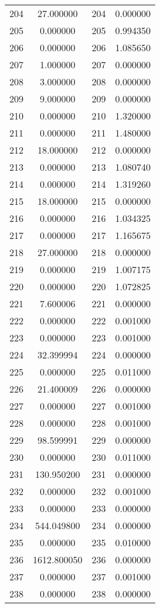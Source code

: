 \documentclass[12pt]{article}
\begin{document}
\begin{longtable}{@{}cccc@{}}
204 & 27.000000 & 204 & 0.000000 \\
205 & 0.000000 & 205 & 0.994350 \\
206 & 0.000000 & 206 & 1.085650 \\
207 & 1.000000 & 207 & 0.000000 \\
208 & 3.000000 & 208 & 0.000000 \\
209 & 9.000000 & 209 & 0.000000 \\
210 & 0.000000 & 210 & 1.320000 \\
211 & 0.000000 & 211 & 1.480000 \\
212 & 18.000000 & 212 & 0.000000 \\
213 & 0.000000 & 213 & 1.080740 \\
214 & 0.000000 & 214 & 1.319260 \\
215 & 18.000000 & 215 & 0.000000 \\
216 & 0.000000 & 216 & 1.034325 \\
217 & 0.000000 & 217 & 1.165675 \\
218 & 27.000000 & 218 & 0.000000 \\
219 & 0.000000 & 219 & 1.007175 \\
220 & 0.000000 & 220 & 1.072825 \\
221 & 7.600006 & 221 & 0.000000 \\
222 & 0.000000 & 222 & 0.001000 \\
223 & 0.000000 & 223 & 0.001000 \\
224 & 32.399994 & 224 & 0.000000 \\
225 & 0.000000 & 225 & 0.011000 \\
226 & 21.400009 & 226 & 0.000000 \\
227 & 0.000000 & 227 & 0.001000 \\
228 & 0.000000 & 228 & 0.001000 \\
229 & 98.599991 & 229 & 0.000000 \\
230 & 0.000000 & 230 & 0.011000 \\
231 & 130.950200 & 231 & 0.000000 \\
232 & 0.000000 & 232 & 0.001000 \\
233 & 0.000000 & 233 & 0.000000 \\
234 & 544.049800 & 234 & 0.000000 \\
235 & 0.000000 & 235 & 0.010000 \\
236 & 1612.800050 & 236 & 0.000000 \\
237 & 0.000000 & 237 & 0.001000 \\
238 & 0.000000 & 238 & 0.000000 \\

\end{longtable}
\end{document}
